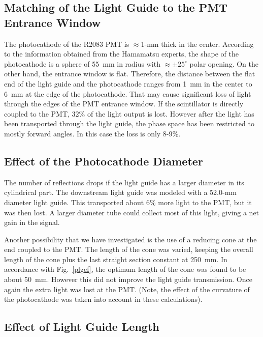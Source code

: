 \subsection{Matching of the Light Guide to the PMT Entrance Window}
\label{mu6}

The photocathode of the R2083 PMT is $\approx$1-mm thick in the center.  
According to the information obtained from the Hamamatsu experts, the 
shape of the photocathode is a sphere of 55~mm in radius with 
$\approx \pm 25^\circ$ polar opening.  On the other hand, the entrance 
window is flat.  Therefore, the distance between the flat end of the light 
guide and the photocathode ranges from 1~mm in the center to 6~mm at the 
edge of the photocathode.  That may cause significant loss of light through 
the edges of the PMT entrance window.  If the scintillator is directly 
coupled to the PMT, 32\% of the light output is lost.  However after the 
light has been transported through the light guide, the phase space has 
been restricted to mostly forward angles. In this case the loss is only 8-9\%.

\subsection{Effect of the Photocathode Diameter}
\label{mu7}

The number of reflections drops if the light guide has a larger diameter in 
its cylindrical part.  The downstream light guide was modeled with a 52.0-mm 
diameter light guide.  This transported about 6\% more light to the PMT, but 
it was then lost.  A larger diameter tube could collect most of this light, 
giving a net gain in the signal.

Another possibility that we have investigated is the use of a reducing cone 
at the end coupled to the PMT.  The length of the cone was varied, keeping 
the overall length of the cone plus the last straight section constant at 
250~mm.  In accordance with Fig.~\ref{plgef}, the optimum length of the cone 
was found to be about 50~mm.  However this did not improve the light guide 
transmission.  Once again the extra light was lost at the PMT. (Note, the 
effect of the curvature of the photocathode was taken into account in these 
calculations).

\subsection{Effect of Light Guide Length}
\label{mu8}

